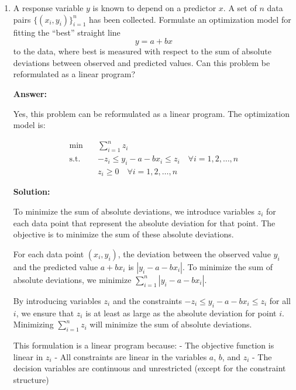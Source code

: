 \documentclass[11pt]{article}
\begin{document}
\begin{enumerate}
\item A response variable $y$ is known to depend on a predictor $x$. 
A set of $n$ data pairs $\{(x_i,y_i)\}_{i=1}^n$ has been collected.  Formulate an optimization model for fitting the ``best'' straight line
  \[
    y = a + bx
  \]
  to the data, where best is measured with respect to the {sum of absolute deviations} 
  between observed and predicted values. Can this problem be reformulated as a linear program?

\textbf{Answer:}

Yes, this problem can be reformulated as a linear program. The optimization model is:

\begin{align*}
\min \quad & \sum_{i=1}^n z_i \\
\text{s.t.} \quad & -z_i \leq y_i - a - bx_i \leq z_i \quad \forall i = 1, 2, \ldots, n \\
& z_i \geq 0 \quad \forall i = 1, 2, \ldots, n
\end{align*}

\textbf{Solution:}

To minimize the sum of absolute deviations, we introduce variables $z_i$ for each data point that represent the absolute deviation for that point. The objective is to minimize the sum of these absolute deviations.

For each data point $(x_i, y_i)$, the deviation between the observed value $y_i$ and the predicted value $a + bx_i$ is $|y_i - a - bx_i|$. To minimize the sum of absolute deviations, we minimize $\sum_{i=1}^n |y_i - a - bx_i|$.

By introducing variables $z_i$ and the constraints $-z_i \leq y_i - a - bx_i \leq z_i$ for all $i$, we ensure that $z_i$ is at least as large as the absolute deviation for point $i$. Minimizing $\sum_{i=1}^n z_i$ will minimize the sum of absolute deviations.

This formulation is a linear program because:
- The objective function is linear in $z_i$
- All constraints are linear in the variables $a$, $b$, and $z_i$
- The decision variables are continuous and unrestricted (except for the constraint structure)


\end{enumerate}
\end{document}

